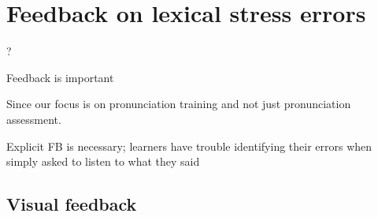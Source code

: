 %
%
\chapter{Feedback on lexical stress errors}
\label{chap:feedback}


 	\citep{Hattie2007}?


Feedback is important \citep{Neri2002}

Since our focus is on pronunciation training and not just pronunciation assessment.

Explicit FB is necessary; learners have trouble identifying their errors when simply asked to listen to what they said \citep{Dlaska2013}


%


\section{Visual feedback}
\label{sec:fb:visual}

\citep{Sitaram2011}

%	
%	
	
